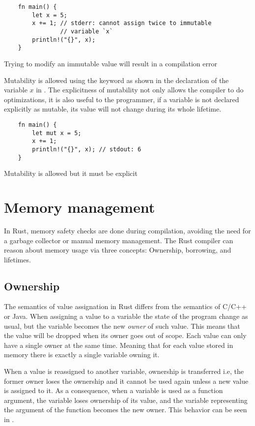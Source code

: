 \begin{listing}[ht]
	\begin{verbatim}
    fn main() {
        let x = 5;
        x += 1; // stderr: cannot assign twice to immutable 
                // variable `x`
        println!("{}", x);
    }
	\end{verbatim}
  \caption{Trying to modify an immutable value will result in a compilation error}
  \label{lst:immutable}
\end{listing}

Mutability is allowed using the  keyword as shown in the declaration
of the variable $x$ in . The explicitness of mutability not
only allows the compiler to do optimizations, it is also useful to the
programmer, if a variable is not declared explicitly as mutable, its value will
not change during its whole lifetime.

\begin{listing}[ht]
	\begin{verbatim}
    fn main() {
        let mut x = 5;
        x += 1;
        println!("{}", x); // stdout: 6 
    }
	\end{verbatim}
  \caption{Mutability is allowed but it must be explicit}
  \label{lst:mutable}
\end{listing}

\section{Memory management}
In Rust, memory safety checks are done during compilation, avoiding the need for
a garbage collector or manual memory management. The Rust compiler can reason
about memory usage via three concepts: Ownership, borrowing, and lifetimes.

\subsection{Ownership}
The semantics of value assignation in Rust differs from the semantics of C/C++
or Java. When assigning a value to a variable the state of the program change as
usual, but the variable becomes the new \textit{owner} of such value.
\cite{ownership_types} This means that the value will be dropped when its owner
goes out of scope. Each value can only have a single owner at the same time.
Meaning that for each value stored in memory there is exactly a single variable
owning it. 

When a value is reassigned to another variable, ownership is transferred i.e,
the former owner loses the ownership and it cannot be used again unless a new
value is assigned to it. As a consequence, when a variable is used as a function
argument, the variable loses ownership of its value, and the variable
representing the argument of the function becomes the new owner. This behavior
can be seen in .

